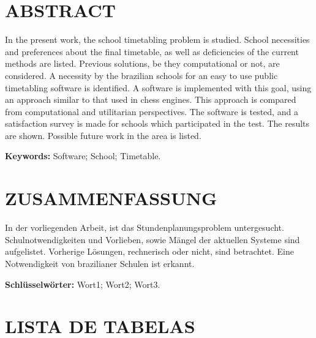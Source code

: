 \documentclass[12pt,a4paper]{article}
\begin{document}
	\thispagestyle{empty}
	\section*{ABSTRACT}

	In the present work, the school timetabling problem is studied. School necessities and preferences about the final timetable, as well as deficiencies of the current methods are listed. Previous solutions, be they computational or not, are considered. A necessity by the brazilian schools for an easy to use public timetabling software is identified. A software is implemented with this goal, using an approach similar to that used in chess engines. This approach is compared from computational and utilitarian perspectives. The software is tested, and a satisfaction survey is made for schools which participated in the test. The results are shown. Possible future work in the area is listed.

	\begingroup
		\setlength{\parindent}{0mm}
		\textbf{Keywords:} Software; School; Timetable.
	\endgroup

	\newpage


	\thispagestyle{empty}
	\section*{ZUSAMMENFASSUNG}

	In der vorliegenden Arbeit, ist das Stundenplanungsproblem untergesucht. Schulnotwendigkeiten und Vorlieben, sowie Mängel der aktuellen Systeme sind aufgelistet. Vorherige Lösungen, rechnerisch oder nicht, sind betrachtet. Eine Notwendigkeit von brazilianer Schulen ist erkannt.

	\lipsum[1]


	\begingroup
		\setlength{\parindent}{0mm}
		\textbf{Schlüsselwörter:} Wort1; Wort2; Wort3.
	\endgroup

	\newpage

	\thispagestyle{empty}
	\section*{LISTA DE TABELAS}
\end{document}
